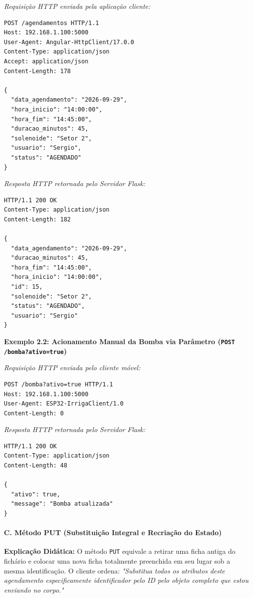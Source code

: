 \textit{Requisição HTTP enviada pela aplicação cliente:}
\begin{lstlisting}
POST /agendamentos HTTP/1.1
Host: 192.168.1.100:5000
User-Agent: Angular-HttpClient/17.0.0
Content-Type: application/json
Accept: application/json
Content-Length: 178

{
  "data_agendamento": "2026-09-29",
  "hora_inicio": "14:00:00",
  "hora_fim": "14:45:00",
  "duracao_minutos": 45,
  "solenoide": "Setor 2",
  "usuario": "Sergio",
  "status": "AGENDADO"
}
\end{lstlisting}

\textit{Resposta HTTP retornada pelo Servidor Flask:}
\begin{lstlisting}
HTTP/1.1 200 OK
Content-Type: application/json
Content-Length: 182

{
  "data_agendamento": "2026-09-29",
  "duracao_minutos": 45,
  "hora_fim": "14:45:00",
  "hora_inicio": "14:00:00",
  "id": 15,
  "solenoide": "Setor 2",
  "status": "AGENDADO",
  "usuario": "Sergio"
}
\end{lstlisting}

\textbf{Exemplo 2.2: Acionamento Manual da Bomba via Parâmetro (\texttt{POST /bomba?ativo=true})}

\textit{Requisição HTTP enviada pelo cliente móvel:}
\begin{lstlisting}
POST /bomba?ativo=true HTTP/1.1
Host: 192.168.1.100:5000
User-Agent: ESP32-IrrigaClient/1.0
Content-Length: 0

\end{lstlisting}

\textit{Resposta HTTP retornada pelo Servidor Flask:}
\begin{lstlisting}
HTTP/1.1 200 OK
Content-Type: application/json
Content-Length: 48

{
  "ativo": true,
  "message": "Bomba atualizada"
}
\end{lstlisting}

\paragraph*{C. Método PUT (Substituição Integral e Recriação do Estado)}

\textbf{Explicação Didática:} O método \texttt{PUT} equivale a retirar uma ficha antiga do fichário e colocar uma nova ficha totalmente preenchida em seu lugar sob a mesma identificação. O cliente ordena: \textit{"Substitua todos os atributos deste agendamento especificamente identificador pelo ID pelo objeto completo que estou enviando no corpo."}

